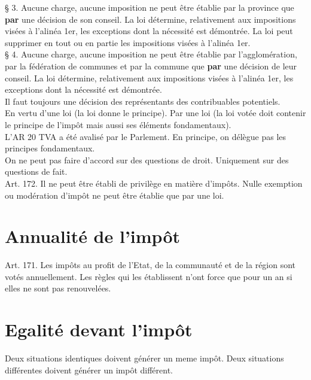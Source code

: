 \documentclass{book}
\begin{document}
  § 3. Aucune charge, aucune imposition ne peut être établie par la province que \textbf{par} une décision de son conseil. La loi détermine, relativement aux impositions visées à l'alinéa 1er, les exceptions dont la nécessité est démontrée. La loi peut supprimer en tout ou en partie les impositions visées à l'alinéa 1er.\\

  § 4. Aucune charge, aucune imposition ne peut être établie par l'agglomération, par la fédération de communes et par la commune que \textbf{par} une décision de leur conseil.  La loi détermine, relativement aux impositions visées à l'alinéa 1er, les exceptions dont la nécessité est démontrée.\\
  
  Il faut toujours une décision des représentants des contribuables potentiels.\\
  
  En vertu d'une loi (la loi donne le principe). Par une loi (la loi votée doit contenir le principe de l'impôt mais aussi ses éléments fondamentaux).\\
  
  L'AR 20 TVA a été avalisé par le Parlement. En principe, on délègue pas les principes fondamentaux.\\
 
 On ne peut pas faire d'accord sur des questions de droit. Uniquement sur des questions de fait.\\
 
Art. 172. Il ne peut être établi de privilège en matière d'impôts. Nulle exemption ou modération d'impôt ne peut être établie que par une loi. \\


\section{Annualité de l'impôt}

  Art. 171. Les impôts au profit de l'Etat, de la communauté et de la région sont votés annuellement.
  Les règles qui les établissent n'ont force que pour un an si elles ne sont pas renouvelées.

\section{Egalité devant l'impôt}

Deux situations identiques doivent générer un meme impôt. Deux situations différentes doivent générer un impôt différent.
\end{document}
